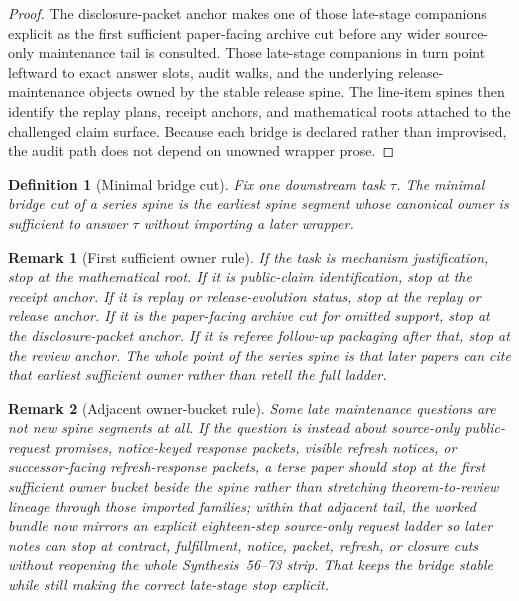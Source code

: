 \documentclass[11pt]{article}
\newtheorem{definition}{Definition}
\newtheorem{remark}{Remark}
\begin{document}
\begin{proof}
The disclosure-packet anchor makes one of those late-stage companions explicit as the first sufficient paper-facing archive cut before any wider source-only maintenance tail is consulted.\cite{series:answerdisclosurepackets}
Those late-stage companions in turn point leftward to exact answer slots, audit walks, and the underlying release-maintenance objects owned by the stable release spine.\cite{series:releasespine}
The line-item spines then identify the replay plans, receipt anchors, and mathematical roots attached to the challenged claim surface.
Because each bridge is declared rather than improvised, the audit path does not depend on unowned wrapper prose.\qedhere
\end{proof}

\begin{definition}[Minimal bridge cut]
Fix one downstream task $\tau$. The \emph{minimal bridge cut} of a series spine is the earliest spine segment whose canonical owner is sufficient to answer $\tau$ without importing a later wrapper.
\end{definition}

\begin{remark}[First sufficient owner rule]
If the task is mechanism justification, stop at the mathematical root. If it is public-claim identification, stop at the receipt anchor. If it is replay or release-evolution status, stop at the replay or release anchor. If it is the paper-facing archive cut for omitted support, stop at the disclosure-packet anchor. If it is referee follow-up packaging after that, stop at the review anchor. The whole point of the series spine is that later papers can cite that earliest sufficient owner rather than retell the full ladder.
\end{remark}

\begin{remark}[Adjacent owner-bucket rule]
Some late maintenance questions are not new spine segments at all.
If the question is instead about source-only public-request promises, notice-keyed response packets, visible refresh notices, or successor-facing refresh-response packets, a terse paper should stop at the first sufficient \emph{owner bucket} beside the spine rather than stretching theorem-to-review lineage through those imported families; within that adjacent tail, the worked bundle now mirrors an explicit eighteen-step source-only request ladder so later notes can stop at contract, fulfillment, notice, packet, refresh, or closure cuts without reopening the whole Synthesis~56--73 strip.
That keeps the bridge stable while still making the correct late-stage stop explicit.
\end{remark}
\end{document}
